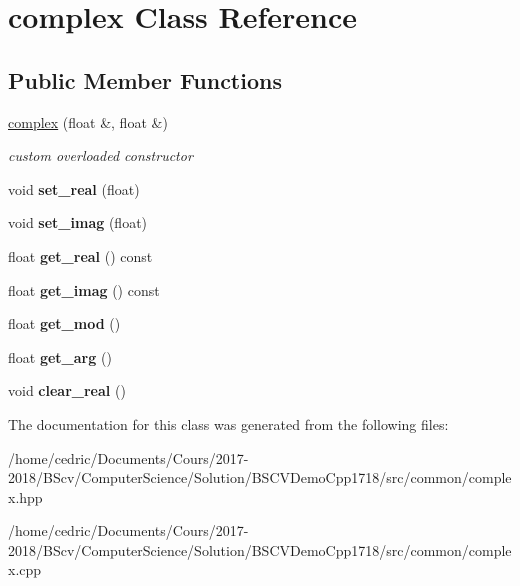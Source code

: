\hypertarget{classcomplex}{}\section{complex Class Reference}
\label{classcomplex}
\subsection*{Public Member Functions}
\begin{DoxyCompactItemize}
\item 
\mbox{\label{classcomplex_aeb1bcb1d9c424b8459c1b4d6438c16d0}} 
\hyperlink{classcomplex_aeb1bcb1d9c424b8459c1b4d6438c16d0}{complex} (float \&, float \&)
\begin{DoxyCompactList}\small\item\em custom overloaded constructor \end{DoxyCompactList}\item 
\mbox{\label{classcomplex_a646ebc656e08ebdcca5f6a6e159c63f6}} 
void {\bfseries set\+\_\+real} (float)
\item 
\mbox{\label{classcomplex_ac2f6fb3247359fd4051afbd7d67d1478}} 
void {\bfseries set\+\_\+imag} (float)
\item 
\mbox{\label{classcomplex_a9d925d5e73ae6c1f0f2c573518e156dd}} 
float {\bfseries get\+\_\+real} () const
\item 
\mbox{\label{classcomplex_aab96befe2b43c0b250eeba51e43758bc}} 
float {\bfseries get\+\_\+imag} () const
\item 
\mbox{\label{classcomplex_aa287b876650a2eecd856d0a3a43fa91a}} 
float {\bfseries get\+\_\+mod} ()
\item 
\mbox{\label{classcomplex_adbf2767affca27c966ba3f9a5fe7ef79}} 
float {\bfseries get\+\_\+arg} ()
\item 
\mbox{\label{classcomplex_aebfb1d7abfa13fb67ff1afe71db30e2c}} 
void {\bfseries clear\+\_\+real} ()
\end{DoxyCompactItemize}


The documentation for this class was generated from the following files\+:\begin{DoxyCompactItemize}
\item 
/home/cedric/\+Documents/\+Cours/2017-\/2018/\+B\+Scv/\+Computer\+Science/\+Solution/\+B\+S\+C\+V\+Demo\+Cpp1718/src/common/complex.\+hpp\item 
/home/cedric/\+Documents/\+Cours/2017-\/2018/\+B\+Scv/\+Computer\+Science/\+Solution/\+B\+S\+C\+V\+Demo\+Cpp1718/src/common/complex.\+cpp\end{DoxyCompactItemize}
